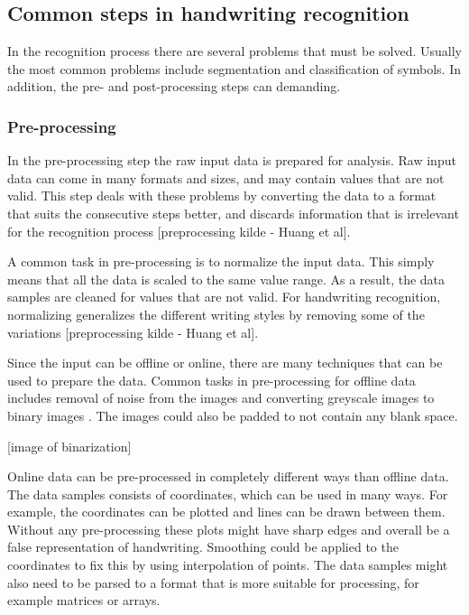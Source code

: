 \subsection{Common steps in handwriting recognition}

In the recognition process there are several problems that must be solved. Usually the most common problems include segmentation and classification of symbols. In addition, the pre- and post-processing steps can demanding.

\subsubsection{Pre-processing}

In the pre-processing step the raw input data is prepared for analysis. Raw input data can come in many formats and sizes, and may contain values that are not valid. This step deals with these problems by converting the data to a format that suits the consecutive steps better, and discards information that is irrelevant for the recognition process [preprocessing kilde - Huang et al].

A common task in pre-processing is to normalize the input data. This simply means that all the data is scaled to the same value range. As a result, the data samples are cleaned for values that are not valid. For handwriting recognition, normalizing generalizes the different writing styles by removing some of the variations [preprocessing kilde - Huang et al].

Since the input can be offline or online, there are many techniques that can be used to prepare the data. Common tasks in pre-processing for offline data includes removal of noise from the images and converting greyscale images to binary images \cite{priya_online_2016}. The images could also be padded to not contain any blank space.

[image of binarization]

Online data can be pre-processed in completely different ways than offline data. The data samples consists of coordinates, which can be used in many ways. For example, the coordinates can be plotted and lines can be drawn between them. Without any pre-processing these plots might have sharp edges and overall be a false representation of handwriting. Smoothing could be applied to the coordinates to fix this by using interpolation of points. The data samples might also need to be parsed to a format that is more suitable for processing, for example matrices or arrays.

